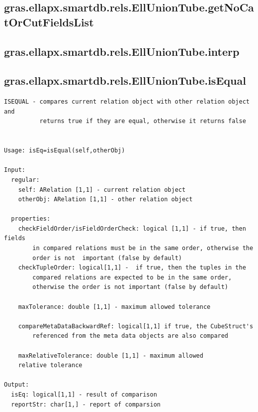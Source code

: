 \documentclass[letterpaper,10pt,english]{sphinxmanual}
\begin{document}
\subsection{gras.ellapx.smartdb.rels.EllUnionTube.getNoCatOrCutFieldsList}
\label{chap_functions:gras-ellapx-smartdb-rels-elluniontube-getnocatorcutfieldslist}

\subsection{gras.ellapx.smartdb.rels.EllUnionTube.interp}
\label{chap_functions:gras-ellapx-smartdb-rels-elluniontube-interp}

\subsection{gras.ellapx.smartdb.rels.EllUnionTube.isEqual}
\label{chap_functions:gras-ellapx-smartdb-rels-elluniontube-isequal}
\begin{Verbatim}[commandchars=\\\{\}]
ISEQUAL - compares current relation object with other relation object and
          returns true if they are equal, otherwise it returns false


Usage: isEq=isEqual(self,otherObj)

Input:
  regular:
    self: ARelation [1,1] - current relation object
    otherObj: ARelation [1,1] - other relation object

  properties:
    checkFieldOrder/isFieldOrderCheck: logical [1,1] - if true, then fields
        in compared relations must be in the same order, otherwise the
        order is not  important (false by default)
    checkTupleOrder: logical[1,1] -  if true, then the tuples in the
        compared relations are expected to be in the same order,
        otherwise the order is not important (false by default)

    maxTolerance: double [1,1] - maximum allowed tolerance

    compareMetaDataBackwardRef: logical[1,1] if true, the CubeStruct's
        referenced from the meta data objects are also compared

    maxRelativeTolerance: double [1,1] - maximum allowed
    relative tolerance

Output:
  isEq: logical[1,1] - result of comparison
  reportStr: char[1,] - report of comparsion
\end{Verbatim}
\end{document}
